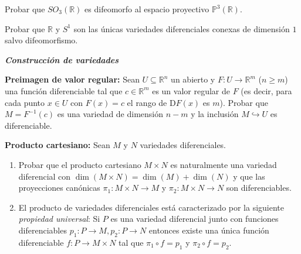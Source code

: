 \documentclass[12pt, a4paper]{amsart}
\theoremstyle{definition}
\newcommand{\RR}{\mathbb{R}}      %
\begin{document}
\begin{question}
\begin{figure}[h]
\begin{center}
\begin{tikzpicture}
\end{tikzpicture}
\end{center}
\label{fig::lemniscata}
\end{figure}
\end{question}

\begin{question}
Probar que $SO_3(\RR)$ es difeomorfo al espacio proyectivo $\mathbb{P}^3(\RR)$.
\end{question}

\begin{question}
Probar que $\RR$ y $S^1$ son las únicas variedades diferenciales conexas de dimensión $1$ salvo difeomorfismo.
\end{question}

\textsl{\textbf{Construcción de variedades}}
\vspace{1em}


\begin{question}\textbf{Preimagen de valor regular:} Sean $U\subseteq\RR^n$ un abierto y $F:U\to\RR^m$ ($n\geq m$) una función diferenciable tal que $c\in\RR^m$ es un valor regular de $F$ (es decir, para cada punto $x\in U$ con $F(x)=c$ el rango de $\mathrm{D}F(x)$ es $m$). Probar que $M=F^{-1}(c)$ es una variedad de dimensión $n-m$ y la inclusión $M\hookrightarrow U$ es diferenciable.
\end{question}

\begin{question}\textbf{Producto cartesiano:} Sean $M$ y $N$ variedades diferenciales.
\begin{enumerate}[label=\textbf{\alph*.}]
\item Probar que el producto cartesiano $M\times N$ es naturalmente una variedad diferencial con $\dim(M\times N)=\dim(M)+\dim(N)$ y que las proyecciones canónicas $\pi_1:M\times N\to M$ y $\pi_2:M\times N\to N$ son diferenciables. 

\item El producto de variedades diferenciales está caracterizado por la siguiente \textit{propiedad universal}: Si $P$ es una variedad diferencial junto con funciones diferenciables $p_1:P\to M, p_2:P\to N$ entonces existe una única función diferenciable $f:P\to M\times N$ tal que $\pi_1\circ f = p_1$ y $\pi_2\circ f = p_2$.
\end{enumerate}
\end{question}
\end{document}
